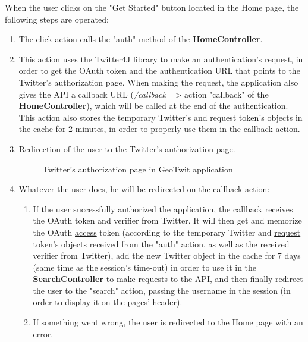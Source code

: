 \documentclass[a4paper,11pt]{report}
\begin{document}
When the user clicks on the "Get Started" button located in the Home page, the following steps are operated:
\begin{enumerate}
	\item The click action calls the "auth" method of the \textbf{HomeController}.
	\item This action uses the Twitter4J library to make an authentication's request, in order to get the OAuth token and the authentication URL that points to the Twitter's authorization page. When making the request, the application also gives the API a callback URL (\emph{/callback} => action "callback" of the \textbf{HomeController}), which will be called at the end of the authentication. This action also stores the temporary Twitter's and request token's objects in the cache for 2 minutes, in order to properly use them in the callback action.
	\item Redirection of the user to the Twitter's authorization page.
	\begin{figure}[H]
	\vspace{-5pt}
	\begin{center}
	\vspace{-5pt}
	\caption{Twitter's authorization page in GeoTwit application}
	\end{center}
	\end{figure}
	\vspace{-20pt}
	\item Whatever the user does, he will be redirected on the callback action:
	\begin{enumerate}
		\item If the user successfully authorized the application, the callback receives the OAuth token and verifier from Twitter. It will then get and memorize the OAuth \underline{access} token (according to the temporary Twitter and \underline{request} token's objects received from the "auth" action, as well as the received verifier from Twitter), add the new Twitter object in the cache for 7 days (same time as the session's time-out) in order to use it in the \textbf{SearchController} to make requests to the API, and then finally redirect the user to the "search" action, passing the username in the session (in order to display it on the pages' header).
		\item If something went wrong, the user is redirected to the Home page with an error.
	\end{enumerate}
\end{enumerate}
\newpage
\end{document}
